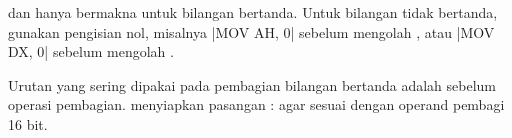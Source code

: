 \begin{peringatanbox}
\vspace{1.1em}
 dan  hanya bermakna untuk bilangan bertanda.
Untuk bilangan tidak bertanda, gunakan pengisian nol, misalnya
\lstasm|MOV AH, 0| sebelum mengolah , atau \lstasm|MOV DX, 0|
sebelum mengolah .
\end{peringatanbox}

\begin{infobox}
\vspace{1.1em}
Urutan yang sering dipakai pada pembagian bilangan bertanda adalah
 sebelum operasi pembagian.  menyiapkan pasangan
: agar sesuai dengan operand pembagi 16 bit.
\end{infobox}

